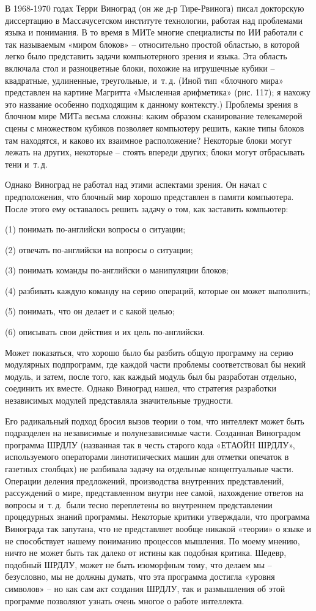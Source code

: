 \documentclass[../main.tex]{subfiles}
\begin{document}
В 1968-1970 годах Терри Виноград (он же д-р Тире-Рвинога) писал докторскую диссертацию в Массачусетском институте технологии, работая над проблемами языка и понимания. В то время в МИТе многие специалисты по ИИ работали с так называемым «миром блоков» \--- относительно простой областью, в которой легко было представить задачи компьютерного зрения и языка. Эта область включала стол и разноцветные блоки, похожие на игрушечные кубики \--- квадратные, удлиненные, треугольные, и~т.\,д. (Иной тип «блочного мира» представлен на картине Магритта «Мысленная арифметика» (рис. 117); я нахожу это название особенно подходящим к данному контексту.) Проблемы зрения в блочном мире МИТа весьма сложны: каким образом сканирование телекамерой сцены с множеством кубиков позволяет компьютеру решить, какие типы блоков там находятся, и каково их взаимное расположение? Некоторые блоки могут лежать на других, некоторые \--- стоять впереди других; блоки могут отбрасывать тени и~т.\,д.

Однако Виноград не работал над этими аспектами зрения. Он начал с предположения, что блочный мир хорошо представлен в памяти компьютера. После этого ему оставалось решить задачу о том, как заставить компьютер:

(1) понимать по-английски вопросы о ситуации;

(2) отвечать по-английски на вопросы о ситуации;

(3) понимать команды по-английски о манипуляции блоков;

(4) разбивать каждую команду на серию операций, которые он может выполнить;

(5) понимать, что он делает и с какой целью;

(6) описывать свои действия и их цель по-английски.

Может показаться, что хорошо было бы разбить общую программу на серию модулярных подпрограмм, где каждой части проблемы соответствовал бы некий модуль, и затем, после того, как каждый модуль был бы разработан отдельно, соединить их вместе. Однако Виноград нашел, что стратегия разработки независимых модулей представляла значительные трудности.

Его радикальный подход бросил вызов теории о том, что интеллект может быть подразделен на независимые и полунезависимые части. Созданная Виноградом программа ШРДЛУ (названная так в честь старого кода «ЕТАОЙН ШРДЛУ», используемого операторами линотипических машин для отметки опечаток в газетных столбцах) не разбивала задачу на отдельные концептуальные части. Операции деления предложений, производства внутренних представлений, рассуждений о мире, представленном внутри нее самой, нахождение ответов на вопросы и~т.\,д.\ были тесно переплетены во внутреннем представлении процедурных знаний программы. Некоторые критики утверждали, что программа Винограда так запутана, что не представляет вообще никакой «теории» о языке и не способствует нашему пониманию процессов мышления. По моему мнению, ничто не может быть так далеко от истины как подобная критика. Шедевр, подобный ШРДЛУ, может не быть изоморфным тому, что делаем мы \--- безусловно, мы не должны думать, что эта программа достигла «уровня символов» \--- но как сам акт создания ШРДЛУ, так и размышления об этой программе позволяют узнать очень многое о работе интеллекта.
\end{document}
